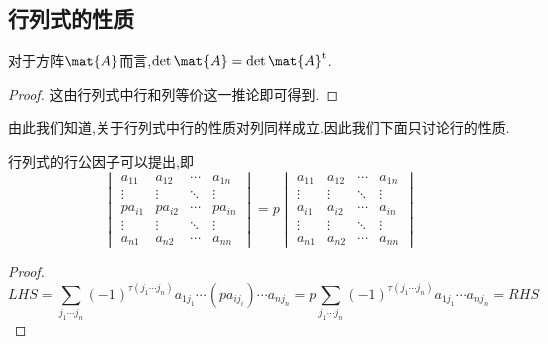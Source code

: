 \documentclass{ctexart}
\begin{document}
\subsection{行列式的性质}
\begin{theorem}
    对于方阵$\mat{A}$而言,$\det\mat{A}=\det\mat{A}^\text{t}$.
\end{theorem}
\begin{proof}
    这由行列式中行和列等价这一推论即可得到.
\end{proof}
由此我们知道,关于行列式中行的性质对列同样成立.因此我们下面只讨论行的性质.
\begin{theorem}
    行列式的行公因子可以提出,即
    \[\begin{vmatrix}
        a_{11}&a_{12}&\cdots&a_{1n}\\
        \vdots&\vdots&\ddots&\vdots\\
        pa_{i1}&pa_{i2}&\cdots&pa_{in}\\
        \vdots&\vdots&\ddots&\vdots\\
        a_{n1}&a_{n2}&\cdots&a_{nn}
    \end{vmatrix}=p
    \begin{vmatrix}
        a_{11}&a_{12}&\cdots&a_{1n}\\
        \vdots&\vdots&\ddots&\vdots\\
        a_{i1}&a_{i2}&\cdots&a_{in}\\
        \vdots&\vdots&\ddots&\vdots\\
        a_{n1}&a_{n2}&\cdots&a_{nn}
    \end{vmatrix}\]
\end{theorem}
\begin{proof}
    \[ LHS
    =\sum_{j_1\cdots j_n}(-1)^{\tau\left(j_1\cdots j_n\right)}a_{1j_1}\cdots (pa_{ij_i})\cdots a_{nj_n}
    =p\sum_{j_1\cdots j_n}(-1)^{\tau\left(j_1\cdots j_n\right)}a_{1j_1}\cdots a_{nj_n}
    =RHS\]
\end{proof}
\end{document}
